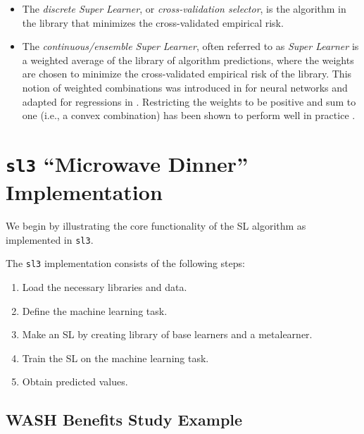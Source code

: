 \documentclass[12pt, krantz2,]{book}
\providecommand{\tightlist}{%
  \setlength{\itemsep}{0pt}\setlength{\parskip}{0pt}}
\theoremstyle{definition}
\theoremstyle{definition}
\theoremstyle{definition}
\newcommand{\1}{\mathbbm{1}}
\begin{document}
\begin{itemize}
  \begin{itemize}
  \tightlist
  \item
    The \emph{discrete Super Learner}, or \emph{cross-validation selector}, is the
    algorithm in the library that minimizes the cross-validated empirical
    risk.
  \item
    The \emph{continuous/ensemble Super Learner}, often referred to as
    \emph{Super Learner} is a weighted average of the library of algorithm
    predictions, where the weights are chosen to minimize the cross-validated
    empirical risk of the library. This notion of weighted combinations
    was introduced in \citet{wolpert1992stacked} for neural networks and adapted for
    regressions in \citet{breiman1996stacked}. Restricting the weights to be
    positive and sum to one (i.e., a convex combination) has been shown to
    perform well in practice \citep{polley2010super, vdl2007super}.
  \end{itemize}
\end{itemize}

\hypertarget{sl3-microwave-dinner-implementation}{%
\section*{\texorpdfstring{\texttt{sl3} ``Microwave Dinner'' Implementation}{sl3 ``Microwave Dinner'' Implementation}}\label{sl3-microwave-dinner-implementation}}


We begin by illustrating the core functionality of the SL algorithm as
implemented in \texttt{sl3}.

The \texttt{sl3} implementation consists of the following steps:

\begin{enumerate}
\def\labelenumi{\arabic{enumi}.}
\setcounter{enumi}{-1}
\tightlist
\item
  Load the necessary libraries and data.
\item
  Define the machine learning task.
\item
  Make an SL by creating library of base learners and a metalearner.
\item
  Train the SL on the machine learning task.
\item
  Obtain predicted values.
\end{enumerate}

\hypertarget{wash-benefits-study-example-1}{%
\subsection*{WASH Benefits Study Example}\label{wash-benefits-study-example-1}}
\end{document}
